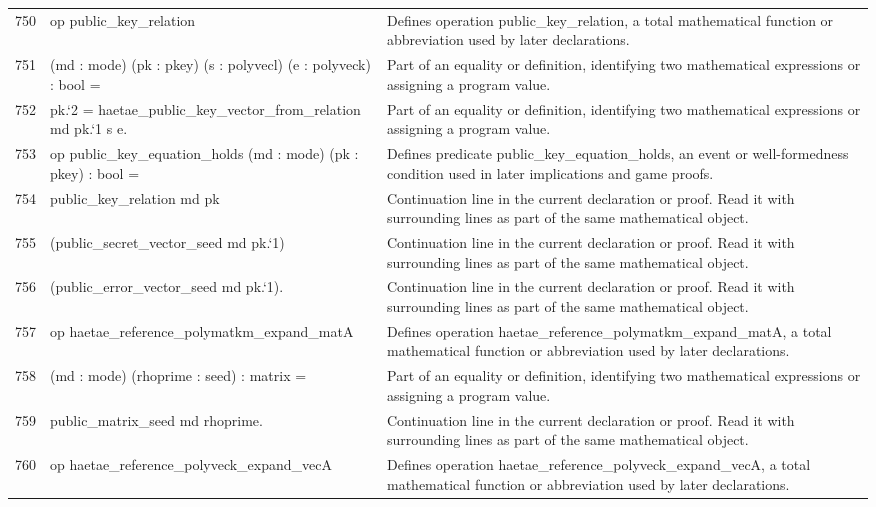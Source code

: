 \documentclass[10pt]{article}
\begin{document}
\begin{longtable}{r L{0.53\textwidth} L{0.37\textwidth}}
750 & {\ttfamily\scriptsize op public\_key\_relation} & Defines operation public\_key\_relation, a total mathematical function or abbreviation used by later declarations. \\
751 & {\ttfamily\scriptsize    (md : mode) (pk : pkey) (s : polyvecl) (e : polyveck) : bool =} & Part of an equality or definition, identifying two mathematical expressions or assigning a program value. \\
752 & {\ttfamily\scriptsize   pk.`2 = haetae\_public\_key\_vector\_from\_relation md pk.`1 s e.} & Part of an equality or definition, identifying two mathematical expressions or assigning a program value. \\
753 & {\ttfamily\scriptsize op public\_key\_equation\_holds (md : mode) (pk : pkey) : bool =} & Defines predicate public\_key\_equation\_holds, an event or well-formedness condition used in later implications and game proofs. \\
754 & {\ttfamily\scriptsize   public\_key\_relation md pk} & Continuation line in the current declaration or proof.  Read it with surrounding lines as part of the same mathematical object. \\
755 & {\ttfamily\scriptsize     (public\_secret\_vector\_seed md pk.`1)} & Continuation line in the current declaration or proof.  Read it with surrounding lines as part of the same mathematical object. \\
756 & {\ttfamily\scriptsize     (public\_error\_vector\_seed md pk.`1).} & Continuation line in the current declaration or proof.  Read it with surrounding lines as part of the same mathematical object. \\
757 & {\ttfamily\scriptsize op haetae\_reference\_polymatkm\_expand\_matA} & Defines operation haetae\_reference\_polymatkm\_expand\_matA, a total mathematical function or abbreviation used by later declarations. \\
758 & {\ttfamily\scriptsize    (md : mode) (rhoprime : seed) : matrix =} & Part of an equality or definition, identifying two mathematical expressions or assigning a program value. \\
759 & {\ttfamily\scriptsize   public\_matrix\_seed md rhoprime.} & Continuation line in the current declaration or proof.  Read it with surrounding lines as part of the same mathematical object. \\
760 & {\ttfamily\scriptsize op haetae\_reference\_polyveck\_expand\_vecA} & Defines operation haetae\_reference\_polyveck\_expand\_vecA, a total mathematical function or abbreviation used by later declarations. \\

\end{longtable}
\end{document}
